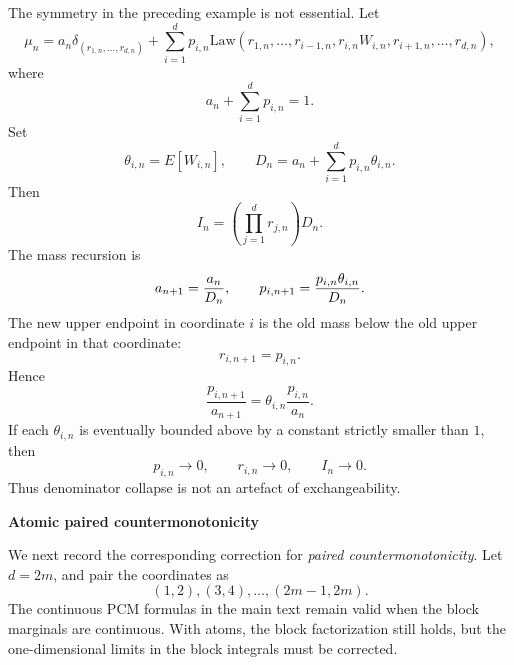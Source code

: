 \documentclass[onecolumn]{article}
\begin{document}
The symmetry in the preceding example is not essential. Let 
\begin{equation*}
\mu _{n}=a_{n}\delta _{(r_{1,n},\ldots ,r_{d,n})}+\sum_{i=1}^{d}p_{i,n}%
\mathrm{Law}(r_{1,n},\ldots ,r_{i-1,n},r_{i,n}W_{i,n},r_{i+1,n},\ldots
,r_{d,n}),
\end{equation*}%
where 
\begin{equation*}
a_{n}+\sum_{i=1}^{d}p_{i,n}=1.
\end{equation*}%
Set 
\begin{equation*}
\theta _{i,n}=E[W_{i,n}],\qquad D_{n}=a_{n}+\sum_{i=1}^{d}p_{i,n}\theta
_{i,n}.
\end{equation*}%
Then 
\begin{equation*}
I_{n}=\left( \prod_{j=1}^{d}r_{j,n}\right) D_{n}.
\end{equation*}%
The mass recursion is 
\begin{equation}
a_{n+1}=\frac{a_{n}}{D_{n}},\qquad p_{i,n+1}=\frac{p_{i,n}\theta _{i,n}}{%
D_{n}}.  \label{eq:atomic-nonsymmetric-mass}
\end{equation}%
The new upper endpoint in coordinate $i$ is the old mass below the old upper
endpoint in that coordinate: 
\begin{equation}
r_{i,n+1}=p_{i,n}.  \label{eq:atomic-nonsymmetric-r}
\end{equation}%
Hence 
\begin{equation}
\frac{p_{i,n+1}}{a_{n+1}}=\theta _{i,n}\frac{p_{i,n}}{a_{n}}.
\label{eq:atomic-nonsymmetric-ratio}
\end{equation}%
If each $\theta _{i,n}$ is eventually bounded above by a constant strictly
smaller than $1$, then 
\begin{equation*}
p_{i,n}\rightarrow 0,\qquad r_{i,n}\rightarrow 0,\qquad I_{n}\rightarrow 0.
\end{equation*}%
Thus denominator collapse is not an artefact of exchangeability.

\begin{flushleft}
\textbf{Atomic paired countermonotonicity}
\end{flushleft}

We next record the corresponding correction for \textit{paired
countermonotonicity}. Let $d=2m$, and pair the coordinates as 
\begin{equation*}
(1,2),(3,4),\ldots ,(2m-1,2m).
\end{equation*}%
The continuous PCM formulas in the main text remain valid when the block
marginals are continuous. With atoms, the block factorization still holds,
but the one-dimensional limits in the block integrals must be corrected.
\end{document}

